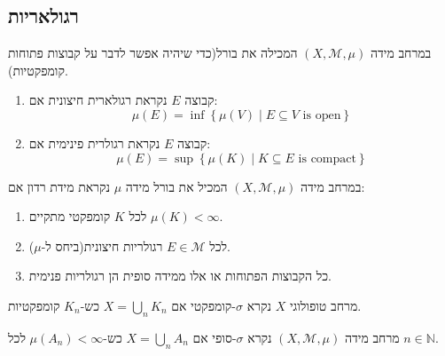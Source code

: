 \documentclass{tstextbook}
\begin{document}
\subsection{רגולאריות}

\begin{definition}
במרחב מידה \(\left( X,\mathcal{M},\mu \right)\) המכילה את בורל(כדי שיהיה אפשר לדבר על קבוצות פתוחות קומפקטיות).

  \begin{enumerate}
    \item קבוצה \(E\) נקראת רגולארית חיצונית אם: 
$$\mu(E)=\inf \left\{  \mu(V)\mid E \subseteq V \text{ is open}  \right\}$$


    \item קבוצה \(E\) נקראת רגולרית פינימית אם: 
$$\mu(E)=\sup  \left\{  \mu(K)\mid K \subseteq E \text{ is compact}  \right\}$$


  \end{enumerate}
\end{definition}
\begin{definition}
במרחב מידה \(\left( X,\mathcal{M},\mu \right)\) המכיל את בורל מידה \(\mu\) נקראת מידת רדון אם:

  \begin{enumerate}
    \item לכל \(K\) קומפקטי מתקיים \(\mu(K)<\infty\). 


    \item לכל \(E \in \mathcal{M}\) רגולריות חיצונית(ביחס ל-\(\mu\)). 


    \item כל הקבוצות הפתוחות או אלו ממידה סופית הן רגולריות פנימית. 


  \end{enumerate}
\end{definition}
\begin{definition}
מרחב טופולוגי \(X\) נקרא \(\sigma\)-קומפקטי אם \(X=\bigcup_{n}K_{n}\) כש-\(K_{n}\) קומפקטיות.

\end{definition}
\begin{definition}
מרחב מידה \(\left( X,\mathcal{M},\mu \right)\) נקרא \(\sigma\)-סופי אם \(X=\bigcup_{n}A_{n}\) כש-\(\mu(A_{n})<\infty\) לכל \(n \in \mathbb{N}\).

\end{definition}
\end{document}
